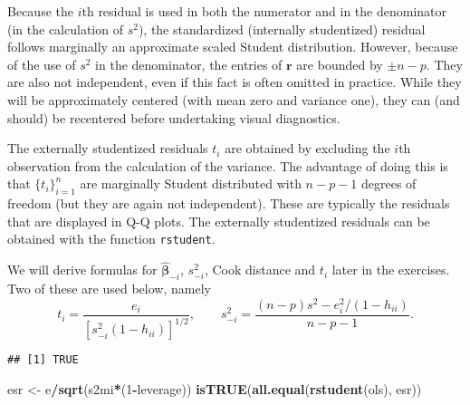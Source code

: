\documentclass[]{book}
\newenvironment{Shaded}{\begin{snugshade}}{\end{snugshade}}
\newcommand{\CommentTok}[1]{\textcolor[rgb]{0.56,0.35,0.01}{\textit{#1}}}
\newcommand{\DecValTok}[1]{\textcolor[rgb]{0.00,0.00,0.81}{#1}}
\newcommand{\KeywordTok}[1]{\textcolor[rgb]{0.13,0.29,0.53}{\textbf{#1}}}
\newcommand{\NormalTok}[1]{#1}
\newcommand{\OperatorTok}[1]{\textcolor[rgb]{0.81,0.36,0.00}{\textbf{#1}}}
\newcommand{\StringTok}[1]{\textcolor[rgb]{0.31,0.60,0.02}{#1}}
\theoremstyle{definition}
\theoremstyle{definition}
\theoremstyle{definition}
\theoremstyle{remark}
\begin{document}
Because the \(i\)th residual is used in both the numerator and in the denominator (in the calculation of \(s^2\)), the standardized (internally studentized) residual follows marginally an approximate scaled Student distribution. However, because of the use of \(s^2\) in the denominator, the entries of \(\boldsymbol{r}\) are bounded by \(\pm n-p\). They are also not independent, even if this fact is often omitted in practice. While they will be approximately centered (with mean zero and variance one), they can (and should) be recentered before undertaking visual diagnostics.

The externally studentized residuals \(t_i\) are obtained by excluding the \(i\)th observation from the calculation of the variance. The advantage of doing this is that \(\{t_i\}_{i=1}^n\) are marginally Student distributed with \(n-p-1\) degrees of freedom (but they are again not independent). These are typically the residuals that are displayed in Q-Q plots. The externally studentized residuals can be obtained with the function \texttt{rstudent}.

We will derive formulas for \(\hat{\boldsymbol{\beta}}_{-i}\), \(s^2_{-i}\), Cook distance and \(t_i\) later in the exercises. Two of these are used below, namely
\[t_i =  \frac{e_i}{[s^2_{-i}(1-h_{ii})]^{1/2}}, \qquad s^2_{-i} = \frac{(n-p)s^2 -e_i^2/(1-h_{ii})}{n-p-1}. \]

\begin{Shaded}
\end{Shaded}

\begin{verbatim}
## [1] TRUE
\end{verbatim}

\begin{Shaded}
\begin{Highlighting}[]
\NormalTok{esr <-}\StringTok{ }\NormalTok{e}\OperatorTok{/}\KeywordTok{sqrt}\NormalTok{(s2mi}\OperatorTok{*}\NormalTok{(}\DecValTok{1}\OperatorTok{-}\NormalTok{leverage))}
\KeywordTok{isTRUE}\NormalTok{(}\KeywordTok{all.equal}\NormalTok{(}\KeywordTok{rstudent}\NormalTok{(ols), esr))}
\end{Highlighting}
\end{Shaded}
\end{document}
